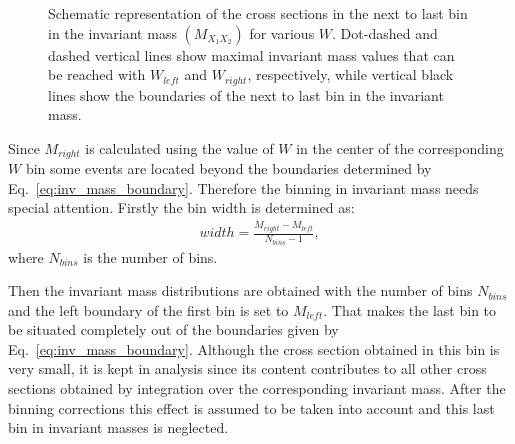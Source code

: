 \documentclass[prc,twocolumn,superscriptaddress,showpacs,amssymb,amsmath,amsfonts,linenumbers,aps]{revtex4-1}
\begin{document}
\begin{figure}[htp]
\begin{center}
\caption{\small Schematic representation of the cross sections in the next to last bin in the invariant mass $(M_{X_{1}X_{2}})$ for various $W$. Dot-dashed and dashed vertical lines show  maximal invariant mass values that can be reached with $W_{left}$ and $W_{right}$, respectively, while vertical black  lines show the boundaries of the next to last bin in the invariant mass.  \label{fig:mass_corr}}
\end{center}
\end{figure}

Since $M_{right}$  is calculated using the value of $W$ in the center of the corresponding $W$ bin some events are located beyond the boundaries determined by Eq.~\ref{eq:inv_mass_boundary}. Therefore the binning in invariant mass needs special attention.
Firstly the bin width is determined as:
\begin{equation}
\begin{aligned}
width = \frac{M_{right}-M_{left}}{N_{bins}-1}, \label{eq:bin_width}
\end{aligned}  
\end{equation} 
where $N_{bins}$ is the number of bins. 

Then the invariant mass distributions are obtained with the number of bins $N_{bins}$ and the left boundary of the first bin is set to $M_{left}$. That makes the last bin to be situated completely out of the boundaries given by Eq.~\ref{eq:inv_mass_boundary}. Although the cross section obtained in this bin is very small, it is kept in analysis since its content contributes to all other cross sections obtained by integration over the corresponding invariant mass. 
After the binning corrections this effect is assumed to be taken into account and this last bin in invariant masses is neglected. 
\end{document}
